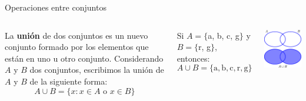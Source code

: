 \documentclass[9pt, aspectratio=169]{beamer}
\begin{document}
\begin{frame}{Operaciones entre conjuntos}
\begin{columns}[c]
\cx
\begin{definition}
    La \textbf{unión} de dos conjuntos es un nuevo conjunto formado por los elementos que están en uno u otro conjunto. Considerando $A$ y $B$ dos conjuntos, escribimos la unión de $A$ y $B$ de la siguiente forma:
    \[ A \cup B = \{ x : x \in A \text{ o } x \in B \} \]
\end{definition}

\begin{example}
    Si $A = \{$a, b, c, g$\}$ y $B = \{$r, g$\}$, entonces:
    \[ A \cup B = \{\text{a}, \text{b}, \text{c}, \text{r}, \text{g} \} \]
\end{example}

\cx
\begin{center}
    \includegraphics[scale=1.0]{figs/fig-04.pdf}
\end{center}
\end{columns}
\end{frame}
\end{document}
